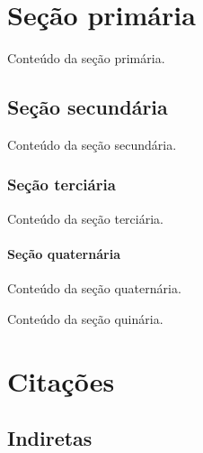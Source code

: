 \documentclass[serif, brazilian]{uffstex}
\begin{document}

\pretextual

\imprimircapa

\imprimirfolhaderosto

\listoffigures*
\cleardoublepage%

\tableofcontents*
\cleardoublepage

\textual

\chapter{Seção primária}

Conteúdo da seção primária.

\section{Seção secundária}

Conteúdo da seção secundária.

\subsection{Seção terciária}

Conteúdo da seção terciária.

\subsubsection{Seção quaternária}

Conteúdo da seção quaternária.


Conteúdo da seção quinária.

\chapter{Citações}

\section{Indiretas}
\end{document}
